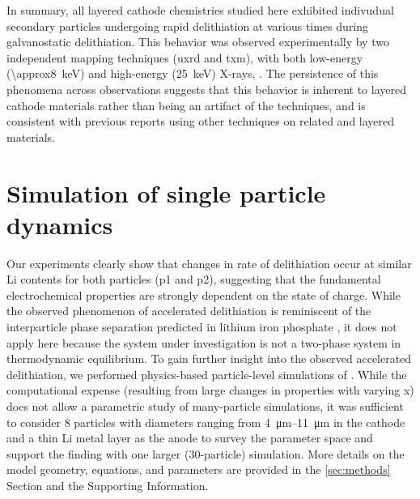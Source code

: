 \documentclass{article}
\begin{document}
In summary, all layered cathode chemistries studied here exhibited
indivudual secondary particles undergoing rapid delithiation at
various times during galvanostatic delithiation. This behavior was
observed experimentally by two independent mapping techniques
(\gls{uxrd} and \gls{txm}), with both low-energy
(\SI{\approx8}{\kilo\electronvolt}) and high-energy
(\SI{25}{\kilo\electronvolt}) X-rays, . The persistence of this
phenomena across observations suggests that this behavior is inherent
to layered cathode materials rather than being an artifact of the
techniques, and is consistent with previous reports using other
techniques on related \nmc{} and  layered
materials\cite{chueh2021,rao2021,wang2020-6}.


\section{Simulation of single particle dynamics}


Our experiments clearly show that changes in rate of delithiation
occur at similar Li contents for both particles (\gls{p1} and
\gls{p2}), suggesting that the fundamental electrochemical properties
are strongly dependent on the state of charge. While the observed
phenomenon of accelerated delithiation is reminiscent of the
interparticle phase separation predicted in lithium iron phosphate
, it does not apply here because the system under
investigation is not a two-phase system in thermodynamic
equilibrium. To gain further insight into the observed accelerated
delithiation, we performed physics-based particle-level simulations of
. While the computational expense (resulting from large changes
in properties with varying x) does not allow a parametric study of
many-particle simulations, it was sufficient to consider 8 particles
with diameters ranging from \SIrange{4}{11}{\micro\meter} in the
cathode and a thin Li metal layer as the anode to survey the parameter
space and support the finding with one larger (30-particle)
simulation. More details on the model geometry, equations, and
parameters are provided in the \ref{sec:methods} Section and the
Supporting Information.
\end{document}
